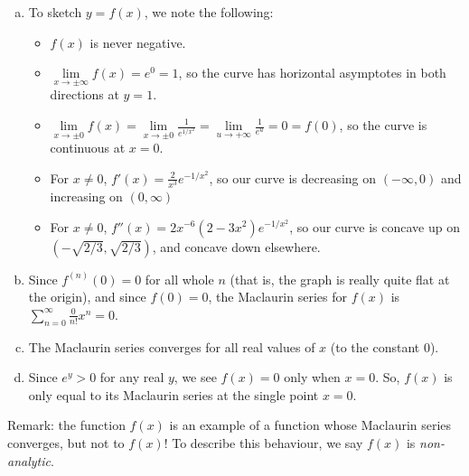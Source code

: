 \begin{solution}
\begin{enumerate}[(a)]
	\item
	To sketch $y=f(x)$, we note the following:
	\begin{itemize}
	\item $f(x)$ is never negative.
	\item $\lim\limits_{x \to \pm \infty} f(x)=e^0=1$, so the curve has horizontal asymptotes in both directions at $y=1$.
	\item $\lim\limits_{x \to \pm 0} f(x)=\lim\limits_{x \to \pm 0} \frac{1}{e^{1/x^2}}=\lim\limits_{u \to +\infty}\frac{1}{e^u}=0=f(0)$, so the curve is continuous at $x=0$.
	\item For $x\neq 0$, $f'(x)=\frac{2}{x^3}e^{-1/x^2}$, so our curve is decreasing on $(-\infty,0)$ and increasing on $(0,\infty)$
	\item For $x\neq 0$,  $f''(x)=2x^{-6}(2-3x^2)e^{-1/x^2}$, so our curve is concave up on $(-\sqrt{2/3},\sqrt{2/3})$, and concave down elsewhere.
\end{itemize}
	\begin{center}
		\end{center}
\item Since $f^{(n)}(0)=0$ for all whole $n$ (that is, the graph is really quite flat at the origin), and since $f(0)=0$, the Maclaurin series for $f(x)$ is $\displaystyle\sum_{n=0}^\infty \frac{0}{n!}x^n=0$.
\item The Maclaurin series converges for all real values of $x$ (to the constant 0).
\item Since $e^y>0$ for any real $y$, we see $f(x)=0$ only when $x=0$. So, $f(x)$ is only equal to its Maclaurin series at the single point $x=0$.
	\end{enumerate}
Remark: the function $f(x)$ is an example of a function whose Maclaurin series converges, but not to $f(x)$! To describe this behaviour, we say $f(x)$ is \emph{non-analytic}.
\end{solution}

